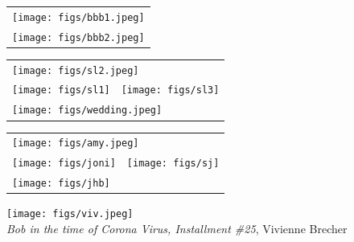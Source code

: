 \documentclass[extrafontsizes,twoside,17pt,a4paper,openany]{memoir}
\begin{document}
\newpage


\begin{tabular}{l}
\texttt{[image: figs/bbb1.jpeg]}\\[12pt]
\texttt{[image: figs/bbb2.jpeg]}\\
\end{tabular}

\newpage
\begin{tabular}{l l}
\multicolumn{2}{l}{\texttt{[image: figs/sl2.jpeg]}}\\
\texttt{[image: figs/sl1]}
  &
    \texttt{[image: figs/sl3]}    \\
  \multicolumn{2}{l}{\texttt{[image: figs/wedding.jpeg]}}\\
\end{tabular}

\newpage
\begin{tabular}{l l}
\multicolumn{2}{l}{\texttt{[image: figs/amy.jpeg]}}\\
\texttt{[image: figs/joni]}
  &
\texttt{[image: figs/sj]}    \\  
\multicolumn{2}{l}{\texttt{[image: figs/jhb]}}
\end{tabular}
\newpage
{}\afterpage{\restorepagecolor}
\phantom{.}

\vfill

\begin{center}
  \texttt{[image: figs/viv.jpeg]}
  \\[2mm]
  \emph{Bob in the time of Corona Virus, Installment \#25}, Vivienne Brecher
\end{center}
\thispagestyle{empty}


\vfill
\end{document}
